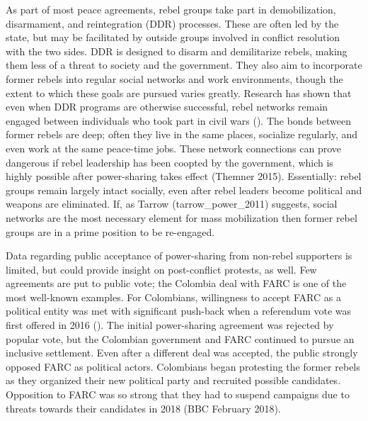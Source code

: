 \documentclass[12pt,]{article}
\begin{document}
As part of most peace agreements, rebel groups take part in
demobilization, disarmament, and reintegration (DDR) processes. These
are often led by the state, but may be facilitated by outside groups
involved in conflict resolution with the two sides. DDR is designed to
disarm and demilitarize rebels, making them less of a threat to society
and the government. They also aim to incorporate former rebels into
regular social networks and work environments, though the extent to
which these goals are pursued varies greatly. Research has shown that
even when DDR programs are otherwise successful, rebel networks remain
engaged between individuals who took part in civil wars
(\citet{wiegink_former_2015}). The bonds between former rebels are deep;
often they live in the same places, socialize regularly, and even work
at the same peace-time jobs. These network connections can prove
dangerous if rebel leadership has been coopted by the government, which
is highly possible after power-sharing takes effect (Themner 2015).
Essentially: rebel groups remain largely intact socially, even after
rebel leaders become political and weapons are eliminated. If, as Tarrow
(tarrow\_power\_2011) suggests, social networks are the most necessary
element for mass mobilization then former rebel groups are in a prime
position to be re-engaged.

Data regarding public acceptance of power-sharing from non-rebel
supporters is limited, but could provide insight on post-conflict
protests, as well. Few agreements are put to public vote; the Colombia
deal with FARC is one of the most well-known examples. For Colombians,
willingness to accept FARC as a political entity was met with
significant push-back when a referendum vote was first offered in 2016
(\citet{katkov_colombias_2016}). The initial power-sharing agreement was
rejected by popular vote, but the Colombian government and FARC
continued to pursue an inclusive settlement. Even after a different deal
was accepted, the public strongly opposed FARC as political actors.
Colombians began protesting the former rebels as they organized their
new political party and recruited possible candidates. Opposition to
FARC was so strong that they had to suspend campaigns due to threats
towards their candidates in 2018 (BBC February 2018).
\end{document}

